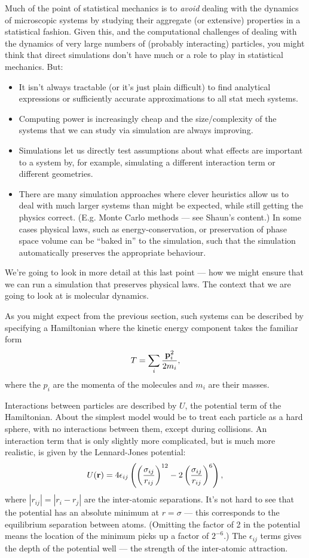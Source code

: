 \documentclass{article}
\begin{document}
Much of the point of statistical mechanics is to \emph{avoid} dealing with the dynamics of microscopic systems by studying their aggregate (or extensive) properties in a statistical fashion. Given this, and the computational challenges of dealing with the dynamics of very large numbers of (probably interacting) particles, you might think that direct simulations don't have much or a role to play in statistical mechanics. But:
\begin{itemize}
	\item It isn't always tractable (or it's just plain difficult) to find analytical expressions or sufficiently accurate approximations to all stat mech systems.
	\item Computing power is increasingly cheap and the size/complexity of the systems that we can study via simulation are always improving.
	\item Simulations let us directly test assumptions about what effects are important to a system by, for example, simulating a different interaction term or different geometries.
	\item There are many simulation approaches where clever heuristics allow us to deal with much larger systems than might be expected, while still getting the physics correct. (E.g. Monte Carlo methods --- see Shaun's content.) In some cases physical laws, such as energy-conservation, or preservation of phase space volume can be ``baked in'' to the simulation, such that the simulation automatically preserves the appropriate behaviour.
\end{itemize}

We're going to look in more detail at this last point --- how we might ensure that we can run a simulation that preserves physical laws. The context that we are going to look at is molecular dynamics.

As you might expect from the previous section, such systems can be described by specifying a Hamiltonian where the kinetic energy component takes the familiar form
$$ T = \sum_i \frac{{\bf p}_i^2}{2m_i},$$
where the $p_i$ are the momenta of the molecules and $m_i$ are their masses.

Interactions between particles are described by $U$, the potential term of the Hamiltonian. About the simplest model would be to treat each particle as a hard sphere, with no interactions between them, except during collisions.
An interaction term that is only slightly more complicated, but is much more realistic, is given by the Lennard-Jones potential:
$$
	U({\bf r}) = 4\epsilon_{ij}\left(\left(\frac{\sigma_{ij}}{r_{ij}}\right)^{12} - 2\left(\frac{\sigma_{ij}}{r_{ij}}\right)^{6}\right),
$$
where $|r_{ij}| = |r_i-r_j|$ are the inter-atomic separations. It's not hard to see that the potential has an absolute minimum at $r = \sigma$ --- this corresponds to the equilibrium separation between atoms. (Omitting the factor of 2 in the potential means the location of the minimum picks up a factor of $2^{-6}$.) The $\epsilon_{ij}$ terms gives the depth of the potential well --- the strength of the inter-atomic attraction. 
\end{document}
